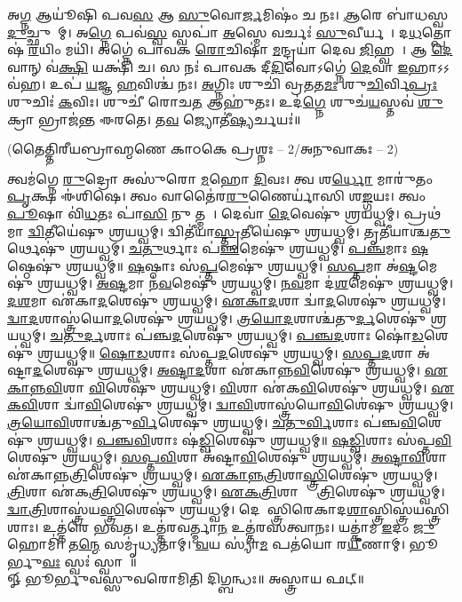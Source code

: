𑌅\ul{𑌗𑍍𑌨} 𑌆𑌯𑍂॑𑌷𑌿 𑌪𑌵\ul{𑌸} 𑌆 \ul{𑌸𑍁}𑌵𑍋\ul{𑌰𑍍𑌜}𑌮𑌿𑌷𑌂॑ 𑌚 𑌨𑌃। \ul{𑌆}𑌰𑍇 𑌬𑌾॑𑌧𑌸𑍍𑌵 \ul{𑌦𑍁}𑌚𑍍𑌛𑍁𑌨𑌾᳚𑌮𑍍। 𑌅\ul{𑌗𑍍𑌨𑍇} 𑌪𑌵॑\ul{𑌸𑍍𑌵} 𑌸𑍍𑌵𑌪𑌾॑ \ul{𑌅}𑌸𑍍𑌮𑍇 𑌵𑌰𑍍𑌚𑌃॑ \ul{𑌸𑍁}𑌵𑍀𑌰𑍍𑌯𑌮𑍍᳚। 𑌦\ul{𑌧}𑌤𑍍𑌪𑍋𑌷॑ \ul{𑌰}𑌯𑌿𑌂 𑌮𑌯𑌿॑।
𑌅𑌗𑍍𑌨𑍇॑ 𑌪𑌾𑌵𑌕 \ul{𑌰𑍋}𑌚𑌿𑌷𑌾॑ \ul{𑌮}𑌨𑍍𑌦𑍍𑌰𑌯𑌾॑ 𑌦𑍇𑌵 \ul{𑌜𑌿}𑌹𑍍𑌵𑌯𑌾᳚। 𑌆 \ul{𑌦𑍇}𑌵𑌾𑌨𑍍 𑌵॑\ul{𑌕𑍍𑌷𑌿} 𑌯𑌕𑍍𑌷𑌿॑ 𑌚। 𑌸 𑌨𑌃॑ 𑌪𑌾𑌵𑌕 𑌦𑍀\ul{𑌦𑌿}𑌵𑍋𑌽𑌗𑍍𑌨𑍇॑ \ul{𑌦𑍇}𑌵𑌾 \ul{𑌇}𑌹𑌾𑌽𑌽𑌵॑𑌹। 𑌉𑌪॑ \ul{𑌯}𑌜𑍍𑌞 \ul{𑌹}𑌵𑌿𑌶𑍍𑌚॑ 𑌨𑌃। \ul{𑌅}𑌗𑍍𑌨𑌿𑌃 𑌶𑍁𑌚𑌿॑ 𑌵𑍍𑌰𑌤𑌤\ul{𑌮𑌃} 𑌶𑍁\ul{𑌚𑌿}𑌰𑍍𑌵𑌿\ul{𑌪𑍍𑌰𑌃} 𑌶𑍁𑌚𑌿𑌃॑ \ul{𑌕}𑌵𑌿𑌃। 𑌶𑍁𑌚𑍀॑ 𑌰𑍋𑌚\ul{𑌤} 𑌆𑌹𑍁॑𑌤𑌃। 𑌉𑌦॑\ul{𑌗𑍍𑌨𑍇} 𑌶𑍁𑌚॑\ul{𑌯}𑌸𑍍𑌤𑌵॑ \ul{𑌶𑍁}𑌕𑍍𑌰𑌾 𑌭𑍍𑌰𑌾𑌜॑𑌨𑍍𑌤 𑌈𑌰𑌤𑍇। 𑌤\ul{𑌵} 𑌜𑍍𑌯𑍋𑌤𑍀॑\ul{𑌷𑍍𑌯}𑌰𑍍𑌚𑌯𑌃॑॥


\centerline{\normalsize (𑌤𑍈𑌤𑍍𑌤𑌿𑌰𑍀𑌯𑌬𑍍𑌰𑌾𑌹𑍍𑌮𑌣𑍇 𑌕𑌾𑌠𑌕𑍇 𑌪𑍍𑌰𑌶𑍍𑌨𑌃 – 2/𑌅𑌨𑍁𑌵𑌾𑌕𑌃 – 2)}
 𑌤𑍍𑌵𑌮॑𑌗𑍍𑌨𑍇 \ul{𑌰𑍁}𑌦𑍍𑌰𑍋 𑌅𑌸𑍁॑𑌰𑍋 \ul{𑌮}𑌹𑍋 \ul{𑌦𑌿}𑌵𑌃। 𑌤𑍍𑌵 𑌶\ul{𑌰𑍍𑌧𑍋} 𑌮𑌾𑌰𑍁॑𑌤𑌂 \ul{𑌪𑍃}𑌕𑍍𑌷 𑌈॑𑌶𑌿𑌷𑍇।
 𑌤𑍍𑌵𑌂 𑌵𑌾𑌤𑍈॑𑌰\ul{𑌰𑍁}𑌣𑍈𑌰𑍍𑌯𑌾॑𑌸𑌿 𑌶\ul{𑌙𑍍𑌗}𑌯𑌃। 𑌤𑍍𑌵𑌂 \ul{𑌪𑍂}𑌷𑌾 𑌵𑌿॑\ul{𑌧}𑌤𑌃 𑌪𑌾॑\ul{𑌸𑌿} 𑌨𑍁 𑌤𑍍𑌮𑌨𑌾᳚।
 𑌦𑍇𑌵𑌾॑ \ul{𑌦𑍇}𑌵𑍇𑌷𑍁॑ 𑌶𑍍𑌰𑌯𑌧𑍍𑌵𑌮𑍍। 𑌪𑍍𑌰𑌥॑𑌮𑌾 \ul{𑌦𑍍𑌵𑌿}𑌤𑍀𑌯𑍇॑𑌷𑍁 𑌶𑍍𑌰𑌯𑌧𑍍𑌵𑌮𑍍।
 𑌦𑍍𑌵𑌿𑌤𑍀॑𑌯𑌾\ul{𑌸𑍍𑌤𑍃}𑌤𑍀𑌯𑍇॑𑌷𑍁 𑌶𑍍𑌰𑌯𑌧𑍍𑌵𑌮𑍍। 𑌤𑍃𑌤𑍀॑𑌯𑌾𑌶𑍍𑌚\ul{𑌤𑍁}𑌰𑍍𑌥𑍇𑌷𑍁॑ 𑌶𑍍𑌰𑌯𑌧𑍍𑌵𑌮𑍍।
 \ul{𑌚}\ul{𑌤𑍁}𑌰𑍍𑌥𑌾𑌃 𑌪॑\ul{𑌞𑍍𑌚}𑌮𑍇𑌷𑍁॑ 𑌶𑍍𑌰𑌯𑌧𑍍𑌵𑌮𑍍। \ul{𑌪}\ul{𑌞𑍍𑌚}𑌮𑌾𑌃 \ul{𑌷}𑌷𑍍𑌠𑍇𑌷𑍁॑ 𑌶𑍍𑌰𑌯𑌧𑍍𑌵𑌮𑍍॥
 \ul{𑌷}𑌷𑍍𑌠𑌾𑌃 𑌸॑\ul{𑌪𑍍𑌤}𑌮𑍇𑌷𑍁॑ 𑌶𑍍𑌰𑌯𑌧𑍍𑌵𑌮𑍍। \ul{𑌸}\ul{𑌪𑍍𑌤}𑌮𑌾 𑌅॑\ul{𑌷𑍍𑌟}𑌮𑍇𑌷𑍁॑ 𑌶𑍍𑌰𑌯𑌧𑍍𑌵𑌮𑍍।
 \ul{𑌅}\ul{𑌷𑍍𑌟}𑌮𑌾 𑌨॑\ul{𑌵}𑌮𑍇𑌷𑍁॑ 𑌶𑍍𑌰𑌯𑌧𑍍𑌵𑌮𑍍। \ul{𑌨}\ul{𑌵}𑌮𑌾 𑌦॑\ul{𑌶}𑌮𑍇𑌷𑍁॑ 𑌶𑍍𑌰𑌯𑌧𑍍𑌵𑌮𑍍।
 \ul{𑌦}\ul{𑌶}𑌮𑌾 𑌏॑𑌕𑌾\ul{𑌦}𑌶𑍇𑌷𑍁॑ 𑌶𑍍𑌰𑌯𑌧𑍍𑌵𑌮𑍍। \ul{𑌏}\ul{𑌕𑌾}\ul{𑌦}𑌶𑌾 𑌦𑍍𑌵𑌾॑\ul{𑌦}𑌶𑍇𑌷𑍁॑ 𑌶𑍍𑌰𑌯𑌧𑍍𑌵𑌮𑍍।
 \ul{𑌦𑍍𑌵𑌾}\ul{𑌦}𑌶𑌾𑌸𑍍𑌤𑍍𑌰॑𑌯𑍋\ul{𑌦}𑌶𑍇𑌷𑍁॑ 𑌶𑍍𑌰𑌯𑌧𑍍𑌵𑌮𑍍। \ul{𑌤𑍍𑌰}\ul{𑌯𑍋}\ul{𑌦}𑌶𑌾𑌶𑍍𑌚॑𑌤𑍁\ul{𑌰𑍍𑌦}𑌶𑍇𑌷𑍁॑ 𑌶𑍍𑌰𑌯𑌧𑍍𑌵𑌮𑍍।
 \ul{𑌚}\ul{𑌤𑍁}\ul{𑌰𑍍𑌦}𑌶𑌾𑌃 𑌪॑𑌞𑍍𑌚\ul{𑌦}𑌶𑍇𑌷𑍁॑ 𑌶𑍍𑌰𑌯𑌧𑍍𑌵𑌮𑍍। \ul{𑌪}\ul{𑌞𑍍𑌚}\ul{𑌦}𑌶𑌾𑌃 𑌷𑍋॑\ul{𑌡}𑌶𑍇𑌷𑍁॑ 𑌶𑍍𑌰𑌯𑌧𑍍𑌵𑌮𑍍॥
 \ul{𑌷𑍋}\ul{𑌡}𑌶𑌾𑌃 𑌸॑𑌪𑍍𑌤\ul{𑌦}𑌶𑍇𑌷𑍁॑ 𑌶𑍍𑌰𑌯𑌧𑍍𑌵𑌮𑍍। \ul{𑌸}\ul{𑌪𑍍𑌤}\ul{𑌦}𑌶𑌾 𑌅॑𑌷𑍍𑌟𑌾\ul{𑌦}𑌶𑍇𑌷𑍁॑ 𑌶𑍍𑌰𑌯𑌧𑍍𑌵𑌮𑍍। \ul{𑌅}\ul{𑌷𑍍𑌟𑌾}\ul{𑌦}𑌶𑌾 𑌏॑𑌕𑌾𑌨𑍍𑌨\ul{𑌵𑌿}\ul{}𑌶𑍇𑌷𑍁॑ 𑌶𑍍𑌰𑌯𑌧𑍍𑌵𑌮𑍍। \ul{𑌏}\ul{𑌕𑌾}\ul{𑌨𑍍𑌨}\ul{𑌵𑌿}\ul{}𑌶𑌾 \ul{𑌵𑌿}\ul{}𑌶𑍇𑌷𑍁॑ 𑌶𑍍𑌰𑌯𑌧𑍍𑌵𑌮𑍍। \ul{𑌵𑌿}\ul{}𑌶𑌾 𑌏॑𑌕\ul{𑌵𑌿}\ul{}𑌶𑍇𑌷𑍁॑ 𑌶𑍍𑌰𑌯𑌧𑍍𑌵𑌮𑍍। \ul{𑌏}\ul{𑌕}\ul{𑌵𑌿}\ul{}𑌶𑌾 𑌦𑍍𑌵𑌾॑\ul{𑌵𑌿}\ul{}𑌶𑍇𑌷𑍁॑ 𑌶𑍍𑌰𑌯𑌧𑍍𑌵𑌮𑍍। \ul{𑌦𑍍𑌵𑌾}\ul{𑌵𑌿}\ul{}𑌶𑌾𑌸𑍍𑌤𑍍𑌰॑𑌯𑍋\ul{𑌵𑌿}\ul{}𑌶𑍇॑𑌷𑍁 𑌶𑍍𑌰𑌯𑌧𑍍𑌵𑌮𑍍। \ul{𑌤𑍍𑌰}\ul{𑌯𑍋}\ul{𑌵𑌿}\ul{}𑌶𑌾𑌶𑍍𑌚॑𑌤𑍁\ul{𑌰𑍍𑌵𑌿}\ul{}𑌶𑍇𑌷𑍁॑ 𑌶𑍍𑌰𑌯𑌧𑍍𑌵𑌮𑍍। \ul{𑌚}\ul{𑌤𑍁}\ul{𑌰𑍍𑌵𑌿}\ul{}𑌶𑌾𑌃 𑌪॑𑌞𑍍𑌚\ul{𑌵𑌿}\ul{}𑌶𑍇𑌷𑍁॑ 𑌶𑍍𑌰𑌯𑌧𑍍𑌵𑌮𑍍। \ul{𑌪}\ul{𑌞𑍍𑌚}\ul{𑌵𑌿}\ul{}𑌶𑌾𑌃 𑌷॑\ul{𑌡𑍍𑌵𑌿}\ul{}𑌶𑍇𑌷𑍁॑ 𑌶𑍍𑌰𑌯𑌧𑍍𑌵𑌮𑍍॥
 \ul{𑌷}\ul{𑌡𑍍𑌵𑌿}\ul{}𑌶𑌾𑌃 𑌸॑𑌪𑍍𑌤\ul{𑌵𑌿}\ul{}𑌶𑍇𑌷𑍁॑ 𑌶𑍍𑌰𑌯𑌧𑍍𑌵𑌮𑍍। \ul{𑌸}\ul{𑌪𑍍𑌤}\ul{𑌵𑌿}\ul{}𑌶𑌾 𑌅॑𑌷𑍍𑌟𑌾\ul{𑌵𑌿}\ul{}𑌶𑍇𑌷𑍁॑ 𑌶𑍍𑌰𑌯𑌧𑍍𑌵𑌮𑍍।
 \ul{𑌅}\ul{𑌷𑍍𑌟𑌾}\ul{𑌵𑌿}\ul{}𑌶𑌾 𑌏॑𑌕𑌾𑌨𑍍𑌨\ul{𑌤𑍍𑌰𑌿}\ul{}𑌶𑍇𑌷𑍁॑ 𑌶𑍍𑌰𑌯𑌧𑍍𑌵𑌮𑍍। \ul{𑌏}\ul{𑌕𑌾}\ul{𑌨𑍍𑌨}\ul{𑌤𑍍𑌰𑌿}\ul{}𑌶𑌾\ul{𑌸𑍍𑌤𑍍𑌰𑌿}\ul{}𑌶𑍇𑌷𑍁॑ 𑌶𑍍𑌰𑌯𑌧𑍍𑌵𑌮𑍍।
 \ul{𑌤𑍍𑌰𑌿}\ul{}𑌶𑌾 𑌏॑𑌕\ul{𑌤𑍍𑌰𑌿}\ul{}𑌶𑍇𑌷𑍁॑ 𑌶𑍍𑌰𑌯𑌧𑍍𑌵𑌮𑍍। \ul{𑌏}\ul{𑌕}\ul{𑌤𑍍𑌰𑌿}\ul{}𑌶𑌾 𑌦𑍍𑌵𑌾᳚\ul{𑌤𑍍𑌰𑌿}\ul{}𑌶𑍇𑌷𑍁॑ 𑌶𑍍𑌰𑌯𑌧𑍍𑌵𑌮𑍍।
 \ul{𑌦𑍍𑌵𑌾}\ul{𑌤𑍍𑌰𑌿}\ul{}𑌶𑌾𑌸𑍍𑌤𑍍𑌰॑𑌯\ul{𑌸𑍍𑌤𑍍𑌰𑌿}\ul{}𑌶𑍇𑌷𑍁॑ 𑌶𑍍𑌰𑌯𑌧𑍍𑌵𑌮𑍍। 𑌦𑍇𑌵𑌾᳚𑌸𑍍𑌤𑍍𑌰𑌿𑌰𑍇𑌕𑌾𑌦\ul{𑌶𑌾}𑌸𑍍𑌤𑍍𑌰𑌿𑌸𑍍𑌤𑍍𑌰॑𑌯𑌸𑍍𑌤𑍍𑌰𑌿𑌶𑌾𑌃।
 𑌉𑌤𑍍𑌤॑𑌰𑍇 𑌭𑌵𑌤। 𑌉𑌤𑍍𑌤॑𑌰𑌵𑌰𑍍𑌤𑍍𑌮𑌾\ul{𑌨} 𑌉𑌤𑍍𑌤॑𑌰𑌸𑌤𑍍𑌵𑌾𑌨𑌃।
 𑌯𑌤𑍍𑌕𑌾॑𑌮 \ul{𑌇}𑌦𑌂 \ul{𑌜𑍁}𑌹𑍋𑌮𑌿॑। 𑌤\ul{𑌨𑍍𑌮𑍇} 𑌸𑌮𑍃॑𑌧𑍍𑌯𑌤𑌾𑌮𑍍।
 \ul{𑌵}𑌯 𑌸𑍍𑌯𑌾॑\ul{𑌮} 𑌪𑌤॑𑌯𑍋 𑌰\ul{𑌯𑍀}𑌣𑌾𑌮𑍍। 𑌭𑍂𑌰𑍍𑌭𑍁\ul{𑌵𑌃} 𑌸𑍍𑌵𑌃॑ 𑌸𑍍𑌵𑌾𑌹𑌾᳚॥\\
𑍐 𑌭𑍂𑌰𑍍𑌭𑍁𑌵𑌸𑍍𑌸𑍁𑌵𑌰𑍋𑌮𑌿𑌤𑌿 𑌦𑌿𑌗𑍍𑌬𑌨𑍍𑌧𑌃॥ 𑌅𑌸𑍍𑌤𑍍𑌰𑌾𑌯 𑌫𑌟𑍍॥

